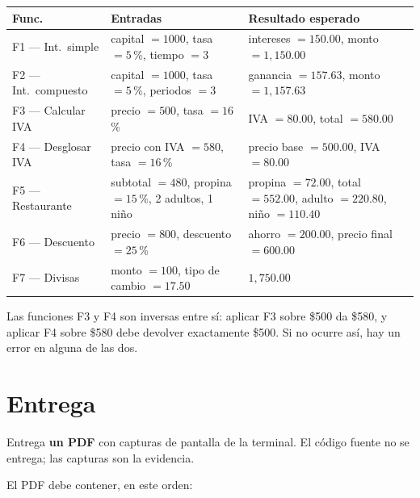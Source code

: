 \documentclass[12pt, oneside]{article}
\begin{document}
\begin{center}
\begin{tabular}{lp{5.2cm}p{4.8cm}}
  \toprule
  \textbf{Func.} & \textbf{Entradas} & \textbf{Resultado esperado} \\
  \midrule
  F1 — Int.\ simple
    & capital $= 1000$, tasa $= 5$\,\%, tiempo $= 3$
    & intereses $= 150.00$, monto $= 1{,}150.00$ \\[4pt]
  F2 — Int.\ compuesto
    & capital $= 1000$, tasa $= 5$\,\%, periodos $= 3$
    & ganancia $= 157.63$, monto $= 1{,}157.63$ \\[4pt]
  F3 — Calcular IVA
    & precio $= 500$, tasa $= 16$\,\%
    & IVA $= 80.00$, total $= 580.00$ \\[4pt]
  F4 — Desglosar IVA
    & precio con IVA $= 580$, tasa $= 16$\,\%
    & precio base $= 500.00$, IVA $= 80.00$ \\[4pt]
  F5 — Restaurante
    & subtotal $= 480$, propina $= 15$\,\%,
      2 adultos, 1 niño
    & propina $= 72.00$, total $= 552.00$,
      adulto $= 220.80$, niño $= 110.40$ \\[4pt]
  F6 — Descuento
    & precio $= 800$, descuento $= 25$\,\%
    & ahorro $= 200.00$, precio final $= 600.00$ \\[4pt]
  F7 — Divisas
    & monto $= 100$, tipo de cambio $= 17.50$
    & $1{,}750.00$ \\
  \bottomrule
\end{tabular}
\end{center}

\begin{advertencia}
  Las funciones F3 y F4 son inversas entre sí: aplicar F3 sobre \$500
  da \$580, y aplicar F4 sobre \$580 debe devolver exactamente \$500.
  Si no ocurre así, hay un error en alguna de las dos.
\end{advertencia}

\section{Entrega}

Entrega \textbf{un PDF} con capturas de pantalla de la terminal.
El código fuente no se entrega; las capturas son la evidencia.

El PDF debe contener, en este orden:
\end{document}
